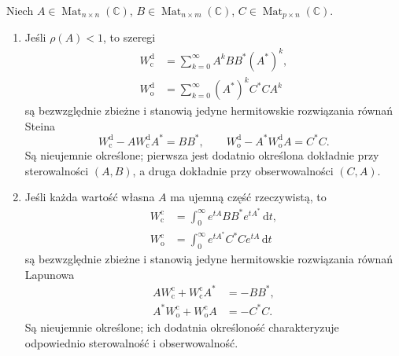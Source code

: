 \begin{twierdzenie}
\label{thm:lin27-gramian-equations}
Niech \(A\in\operatorname{Mat}_{n\times n}(\mathbb C)\),
\(B\in\operatorname{Mat}_{n\times m}(\mathbb C)\),
\(C\in\operatorname{Mat}_{p\times n}(\mathbb C)\).
\begin{enumerate}[label=\textup{(\roman*)}]
\item Jeśli \(\rho(A)<1\), to
szeregi
\[
 \begin{aligned}
 W_{\mathrm c}^{\mathrm d}
 &=\sum_{k=0}^{\infty}A^kBB^*(A^*)^k,\\
 W_{\mathrm o}^{\mathrm d}
 &=\sum_{k=0}^{\infty}(A^*)^kC^*CA^k
 \end{aligned}
\]
są bezwzględnie zbieżne
i stanowią jedyne hermitowskie
rozwiązania równań Steina
\[
 W_{\mathrm c}^{\mathrm d}
 -AW_{\mathrm c}^{\mathrm d}A^*=BB^*,
 \qquad
 W_{\mathrm o}^{\mathrm d}
 -A^*W_{\mathrm o}^{\mathrm d}A=C^*C.
\]
Są nieujemnie określone;
pierwsza jest dodatnio określona
dokładnie przy sterowalności
\((A,B)\), a druga dokładnie przy
obserwowalności \((C,A)\).
\item Jeśli każda wartość własna \(A\)
ma ujemną część rzeczywistą, to
\[
 \begin{aligned}
 W_{\mathrm c}^{\mathrm c}
 &=\int_0^\infty
      e^{tA}BB^*e^{tA^*}\,\mathrm dt,\\
 W_{\mathrm o}^{\mathrm c}
 &=\int_0^\infty
      e^{tA^*}C^*Ce^{tA}\,\mathrm dt
 \end{aligned}
\]
są bezwzględnie zbieżne
i stanowią jedyne hermitowskie
rozwiązania równań Lapunowa
\[
 \begin{aligned}
 AW_{\mathrm c}^{\mathrm c}
   +W_{\mathrm c}^{\mathrm c}A^*&=-BB^*,\\
 A^*W_{\mathrm o}^{\mathrm c}
   +W_{\mathrm o}^{\mathrm c}A&=-C^*C.
 \end{aligned}
\]
Są nieujemnie określone;
ich dodatnia określoność
charakteryzuje odpowiednio
sterowalność i obserwowalność.
\end{enumerate}
\end{twierdzenie}
